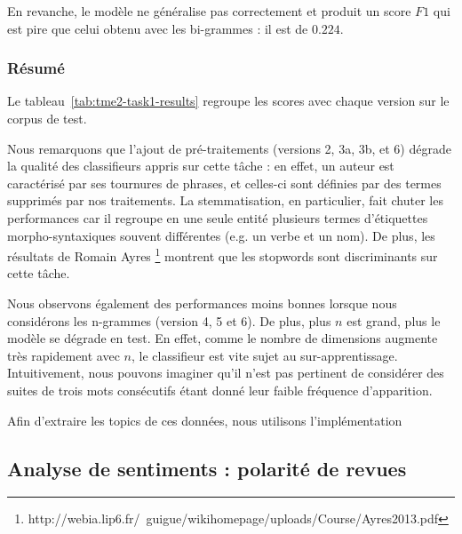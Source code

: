 \documentclass[a4paper]{article}
\newcommand{\tabref}[1]{tableau~\ref{#1}}
\begin{document}
En revanche, le modèle ne généralise pas correctement et produit un score $F1$ qui est
pire que celui obtenu avec les bi-grammes : il est de $0.224$. 

\subsubsection{Résumé}

Le \tabref{tab:tme2-task1-results} regroupe les scores avec chaque version sur
le corpus de test. 

\begin{table}[H]
\centering
{}
\caption{Score $F1$ obtenu sur le corpus de test pour chaque version}
\label{tab:tme2-task1-results}
\end{table}

Nous remarquons que l'ajout de pré-traitements (versions 2, 3a, 3b, et 6) dégrade
la qualité des classifieurs appris sur cette tâche : en effet, un auteur est
caractérisé par ses tournures de phrases, et celles-ci sont définies par des
termes supprimés par nos traitements. La stemmatisation, en particulier, fait
chuter les performances car il regroupe en une seule entité plusieurs termes
d'étiquettes morpho-syntaxiques souvent différentes (e.g. un verbe et un nom).
De plus, les résultats de Romain Ayres
\footnote{http://webia.lip6.fr/~guigue/wikihomepage/uploads/Course/Ayres2013.pdf}
montrent que les stopwords sont discriminants sur cette tâche.

Nous observons également des performances moins bonnes lorsque nous considérons
les n-grammes (version 4, 5 et 6). De plus, plus $n$ est grand, plus le modèle se dégrade en test.
En effet, comme le nombre de dimensions augmente très rapidement avec $n$, le
classifieur est vite sujet au sur-apprentissage. Intuitivement, nous pouvons
imaginer qu'il n'est pas pertinent de considérer des suites de trois mots
consécutifs étant donné leur faible fréquence d'apparition.

Afin d'extraire les topics de ces données, nous utilisons l'implémentation 
\subsection{Analyse de sentiments : polarité de revues}
\end{document}
